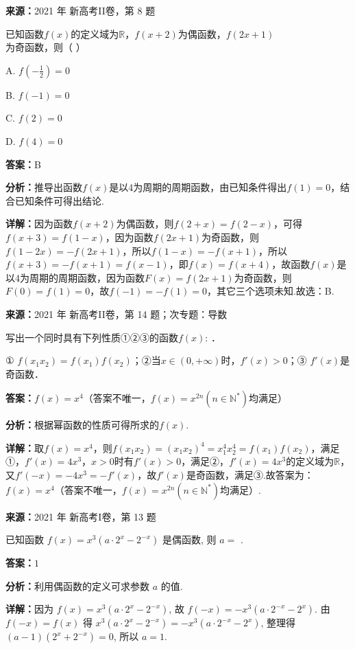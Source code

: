 \begin{question}[points=5]
\textbf{来源：}2021 年 新高考II卷，第 8 题\par
已知函数$f(x)$的定义域为$\mathbb{R}$，$f(x+2)$为偶函数，$f(2x+1)$为奇函数，则（ ）
\begin{choices}
  \item A. $f(-\frac{1}{2})=0$
  \item B. $f(-1)=0$
  \item C. $f(2)=0$
  \item D. $f(4)=0$
\end{choices}
\begin{solution}
\textbf{答案：}B

\textbf{分析：}推导出函数$f(x)$是以4为周期的周期函数，由已知条件得出$f(1)=0$，结合已知条件可得出结论.

\textbf{详解：}因为函数$f(x+2)$为偶函数，则$f(2+x)=f(2-x)$，可得$f(x+3)=f(1-x)$，因为函数$f(2x+1)$为奇函数，则$f(1-2x)=-f(2x+1)$，所以$f(1-x)=-f(x+1)$，所以$f(x+3)=-f(x+1)=f(x-1)$，即$f(x)=f(x+4)$，故函数$f(x)$是以4为周期的周期函数，因为函数$F(x)=f(2x+1)$为奇函数，则$F(0)=f(1)=0$，故$f(-1)=-f(1)=0$，其它三个选项未知.故选：B.
\end{solution}
\end{question}

\begin{question}[points=5]
\textbf{来源：}2021 年 新高考II卷，第 14 题；次专题：导数\par
写出一个同时具有下列性质①②③的函数$f(x)$: ．

① $f(x_1x_2)=f(x_1)f(x_2)$；②当$x\in(0,+\infty)$时，$f'(x)>0$；③ $f'(x)$是奇函数．
\fillin[{$f(x)=x^4$（答案不唯一，$f(x)=x^{2n}(n\in\mathbb{N}^*)$均满足）}]
\begin{solution}
\textbf{答案：}$f(x)=x^4$（答案不唯一，$f(x)=x^{2n}(n\in\mathbb{N}^*)$均满足）

\textbf{分析：}根据幂函数的性质可得所求的$f(x)$.

\textbf{详解：}取$f(x)=x^4$，则$f(x_1x_2)=(x_1x_2)^4=x_1^4x_2^4=f(x_1)f(x_2)$，满足①，$f'(x)=4x^3$，$x>0$时有$f'(x)>0$，满足②，$f'(x)=4x^3$的定义域为$\mathbb{R}$，又$f'(-x)=-4x^3=-f'(x)$，故$f'(x)$是奇函数，满足③.故答案为：$f(x)=x^4$（答案不唯一，$f(x)=x^{2n}(n\in\mathbb{N}^*)$均满足）.
\end{solution}
\end{question}

\begin{question}[points=5]
\textbf{来源：}2021 年 新高考I卷，第 13 题\par
已知函数 $f(x) = x^3(a \cdot 2^x - 2^{-x})$ 是偶函数, 则 $a =$ .
\fillin[{$1$}]
\begin{solution}
\textbf{答案：}$1$

\textbf{分析：}利用偶函数的定义可求参数 $a$ 的值.

\textbf{详解：}因为 $f(x) = x^3(a \cdot 2^x - 2^{-x})$, 故 $f(-x) = -x^3(a \cdot 2^{-x} - 2^x)$. 由 $f(-x) = f(x)$ 得 $x^3(a \cdot 2^x - 2^{-x}) = -x^3(a \cdot 2^{-x} - 2^x)$, 整理得 $(a-1)(2^x + 2^{-x}) = 0$, 所以 $a = 1$.
\end{solution}
\end{question}

